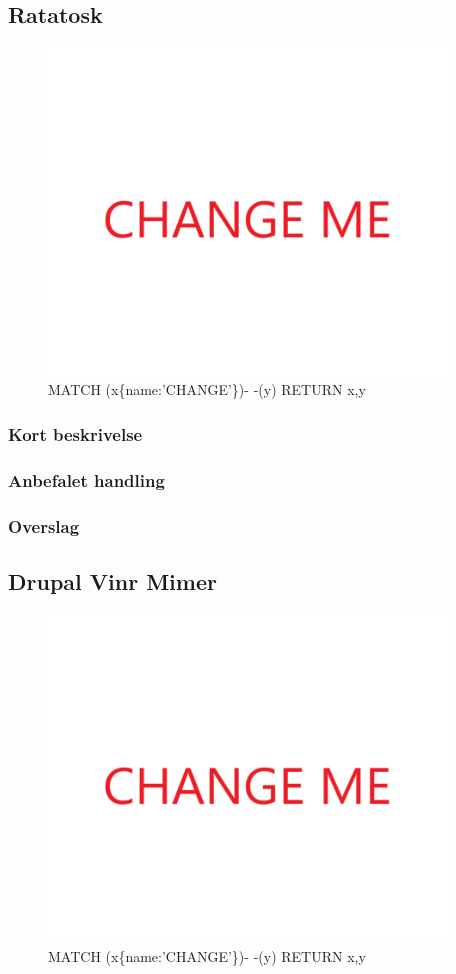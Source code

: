 \documentclass{article}
\begin{document}
\subsection{Ratatosk}
\begin{figure}[h]
\includegraphics[width=300pt]{CHANGE.PNG}
\caption{MATCH (x\{name:'CHANGE'\})- -(y) RETURN x,y}
\end{figure}
\subsubsection{Kort beskrivelse}
\subsubsection{Anbefalet handling}
\subsubsection{Overslag}


\subsection{Drupal Vinr Mimer}
\begin{figure}[h]
\includegraphics[width=300pt]{CHANGE.PNG}
\caption{MATCH (x\{name:'CHANGE'\})- -(y) RETURN x,y}
\end{figure}
\end{document}
